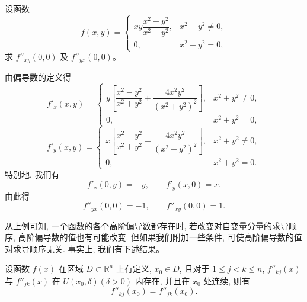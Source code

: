 \documentclass[12pt,fontset=fandol]{ctexart}
\begin{document}
\begin{example}\label{course-example-14-2-7}\quad 设函数
\[
  f(x,y)=
  \begin{cases}
    xy\dfrac{x^2-y^2}{x^2+y^2}, &x^2+y^2\ne0,\\
    0, &x^2+y^2=0,
  \end{cases}
\]
求 $f''_{xy}(0,0)$ 及 $f''_{yx}(0,0)$。

\end{example}
\begin{solve}\quad 由偏导数的定义得
\[
  f'_x(x,y)=
  \begin{cases}
    y\left[\dfrac{x^2-y^2}{x^2+y^2}+\dfrac{4x^2y^2}{(x^2+y^2)^2}\right], &x^2+y^2\ne0,\\
    0, &x^2+y^2=0,
  \end{cases}
\]
\[
  f'_y(x,y)=
  \begin{cases}
    x\left[\dfrac{x^2-y^2}{x^2+y^2}-\dfrac{4x^2y^2}{(x^2+y^2)^2}\right], &x^2+y^2\ne0,\\
    0, &x^2+y^2=0.
  \end{cases}
\]
特别地, 我们有
\[
  f'_x(0,y)=-y,\qquad f'_y(x,0)=x.
\]
由此得
\[
  f''_{yx}(0,0)=-1,\qquad f''_{xy}(0,0)=1.
\]

从上例可知, 一个函数的各个高阶偏导数都存在时, 若改变对自变量分量的求导顺序, 高阶偏导数的值也有可能改变. 但如果我们附加一些条件, 可使高阶偏导数的值对求导顺序无关. 事实上, 我们有下述结果。

\end{solve}
\begin{theorem}\label{course-theorem-14-2-3}\quad 设函数 $f(x)$ 在区域 $D\subset\mathbb R^n$ 上有定义, $x_0\in D$, 且对于 $1\leqslant j<k\leqslant n$, $f''_{kj}(x)$ 与 $f''_{jk}(x)$ 在 $U(x_0,\delta)(\delta>0)$ 内存在, 并且在 $x_0$ 处连续, 则有
\[
  f''_{kj}(x_0)=f''_{jk}(x_0).
\]

\end{theorem}
\end{document}
